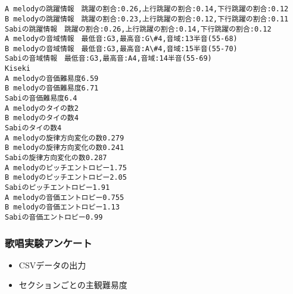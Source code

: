 \documentclass[11pt]{article}
\providecommand{\tightlist}{%
      \setlength{\itemsep}{0pt}\setlength{\parskip}{0pt}}
\begin{document}
    \begin{center}
    \end{center}
    { \hspace*{\fill} \\}
    
    \begin{center}
    \end{center}
    { \hspace*{\fill} \\}
    
    \begin{Verbatim}[commandchars=\\\{\}]
A melodyの跳躍情報　跳躍の割合:0.26,上行跳躍の割合:0.14,下行跳躍の割合:0.12
B melodyの跳躍情報　跳躍の割合:0.23,上行跳躍の割合:0.12,下行跳躍の割合:0.11
Sabiの跳躍情報　跳躍の割合:0.26,上行跳躍の割合:0.14,下行跳躍の割合:0.12
A melodyの音域情報　最低音:G3,最高音:G\#4,音域:13半音(55-68)
B melodyの音域情報　最低音:G3,最高音:A\#4,音域:15半音(55-70)
Sabiの音域情報　最低音:G3,最高音:A4,音域:14半音(55-69)
Kiseki
A melodyの音価難易度6.59
B melodyの音価難易度6.71
Sabiの音価難易度6.4
A melodyのタイの数2
B melodyのタイの数4
Sabiのタイの数4
A melodyの旋律方向変化の数0.279
B melodyの旋律方向変化の数0.241
Sabiの旋律方向変化の数0.287
A melodyのピッチエントロピー1.75
B melodyのピッチエントロピー2.05
Sabiのピッチエントロピー1.91
A melodyの音価エントロピー0.755
B melodyの音価エントロピー1.13
Sabiの音価エントロピー0.99

    \end{Verbatim}

    \hypertarget{ux6b4cux5531ux5b9fux9a13ux30a2ux30f3ux30b1ux30fcux30c8}{%
\subsubsection{歌唱実験アンケート}\label{ux6b4cux5531ux5b9fux9a13ux30a2ux30f3ux30b1ux30fcux30c8}}

\begin{itemize}
\tightlist
\item
  CSVデータの出力
\item
  セクションごとの主観難易度
\end{itemize}
\end{document}

